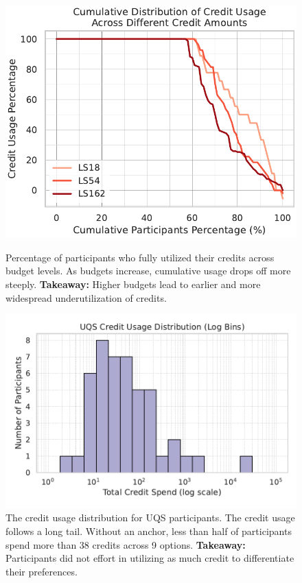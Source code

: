 \begin{figure}[ht]
  \centering

  \begin{minipage}[t]{0.48\textwidth}
    \centering
    \includegraphics[width=\textwidth]{content/image/cumulative_distribution_credit_usage.pdf}
    \caption{
    Percentage of participants who fully utilized their credits across budget levels. As budgets increase, cumulative usage drops off more steeply.
    \textbf{Takeaway:} Higher budgets lead to earlier and more widespread underutilization of credits.
    }   
    \label{fig:credit_usage_descending}
  \end{minipage}
  \hfill
  \begin{minipage}[t]{0.48\textwidth}
    \centering
    \includegraphics[width=\textwidth]{content/image/uqs_credit_usage_distribution_logbins.pdf}
    \caption{The credit usage distribution for UQS participants. The credit usage follows a long tail. Without an anchor, less than half of participants spend more than 38 credits across 9 options. \textbf{Takeaway:} Participants did not effort in utilizing as much credit to differentiate their preferences.}
    \label{fig:uqs_usage}
  \end{minipage}

\end{figure}



